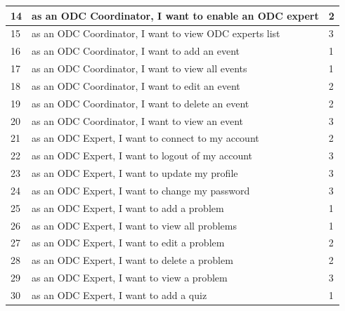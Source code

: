 \begin{longtable}{|l|l|l|}
      14                     & as an ODC Coordinator, I want to enable an ODC expert    & 2                 \\ \hline
      15                     & as an ODC Coordinator, I want to view ODC experts list   & 3                 \\ \hline
      16                     & as an ODC Coordinator, I want to add an event            & 1                 \\ \hline
      17                     & as an ODC Coordinator, I want to view all events         & 1                 \\ \hline
      18                     & as an ODC Coordinator, I want to edit an event           & 2                 \\ \hline
      19                     & as an ODC Coordinator, I want to delete an event         & 2                 \\ \hline
      20                     & as an ODC Coordinator, I want to view an event           & 3                 \\ \hline
      21                     & as an ODC Expert, I want to connect to my account        & 2                 \\ \hline
      22                     & as an ODC Expert, I want to logout of my account         & 3                 \\ \hline
      23                     & as an ODC Expert, I want to update my profile            & 3                 \\ \hline
      24                     & as an ODC Expert, I want to change my password           & 3                 \\ \hline
      25                     & as an ODC Expert, I want to add a problem                & 1                 \\ \hline
      26                     & as an ODC Expert, I want to view all problems            & 1                 \\ \hline
      27                     & as an ODC Expert, I want to edit a problem               & 2                 \\ \hline
      28                     & as an ODC Expert, I want to delete a problem             & 2                 \\ \hline
      29                     & as an ODC Expert, I want to view a problem               & 3                 \\ \hline
      30                     & as an ODC Expert, I want to add a quiz                   & 1                 \\ \hline

\end{longtable}
